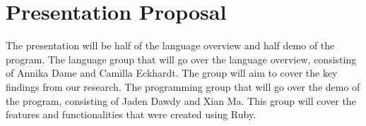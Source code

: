 \documentclass[a4paper,10pt]{article}
\begin{document}
  \section{Presentation Proposal}
  \label{sec: presentation_proposal}

  The presentation will be half of the language overview and half demo of the program. The language group that will go over the language overview, consisting of Annika Dame
  and Camilla Eckhardt. The group will aim to cover the key findings from our research. The programming group that will go over the demo of the program, consisting of
  Jaden Dawdy and Xian Ma. This group will cover the features and functionalities that were created using Ruby.

%


\end{document}
